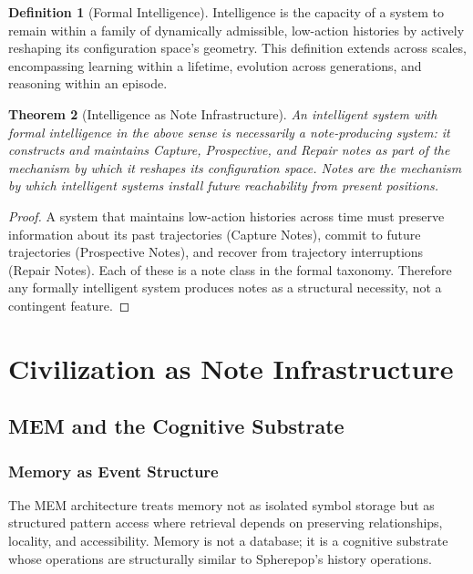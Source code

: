 \documentclass[12pt, a4paper, openany]{book}
\theoremstyle{plain}
\newtheorem{theorem}{Theorem}[chapter]
\theoremstyle{definition}
\newtheorem{definition}[theorem]{Definition}
\theoremstyle{remark}
\begin{document}
\begin{definition}[Formal Intelligence]
Intelligence is the capacity of a system to remain within a family of dynamically
admissible, low-action histories by actively reshaping its configuration space's
geometry. This definition extends across scales, encompassing learning within a
lifetime, evolution across generations, and reasoning within an episode.
\end{definition}

\begin{theorem}[Intelligence as Note Infrastructure]
An intelligent system with formal intelligence in the above sense is necessarily
a note-producing system: it constructs and maintains Capture, Prospective, and
Repair notes as part of the mechanism by which it reshapes its configuration space.
Notes are the mechanism by which intelligent systems install future reachability
from present positions.
\end{theorem}

\begin{proof}
A system that maintains low-action histories across time must preserve information
about its past trajectories (Capture Notes), commit to future trajectories
(Prospective Notes), and recover from trajectory interruptions (Repair Notes).
Each of these is a note class in the formal taxonomy. Therefore any formally
intelligent system produces notes as a structural necessity, not a contingent
feature.
\end{proof}

\part{Civilization as Note Infrastructure}

\chapter{MEM and the Cognitive Substrate}

\section{Memory as Event Structure}

The MEM architecture treats memory not as isolated symbol storage but as
structured pattern access where retrieval depends on preserving relationships,
locality, and accessibility. Memory is not a database; it is a cognitive substrate
whose operations are structurally similar to Spherepop's history operations.
\end{document}
